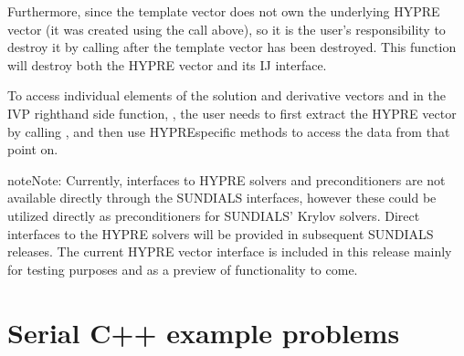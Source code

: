 \documentclass[letterpaper,10pt,english]{sphinxmanual}
\begin{document}
\sphinxAtStartPar
Furthermore, since the template vector does not own the underlying
HYPRE vector (it was created using the  call
above), so it is the user’s responsibility to destroy it by calling
 after the template vector  has
been destroyed.  This function will destroy both the HYPRE vector
and its IJ interface.

\sphinxAtStartPar
To access individual elements of the solution and derivative vectors
 and  in the IVP right\sphinxhyphen{}hand side function, , the
user needs to first extract the HYPRE vector by calling
, and then use HYPRE\sphinxhyphen{}specific methods to access
the data from that point on.

\begin{sphinxadmonition}{note}{Note:}
\sphinxAtStartPar
Currently, interfaces to HYPRE solvers and preconditioners are not
available directly through the SUNDIALS interfaces, however these
could be utilized directly as preconditioners for SUNDIALS’ Krylov
solvers.  Direct interfaces to the HYPRE solvers will be provided
in subsequent SUNDIALS releases.  The current HYPRE vector
interface is included in this release mainly for testing purposes
and as a preview of functionality to come.
\end{sphinxadmonition}

\sphinxstepscope


\chapter{Serial C++ example problems}
\label{\detokenize{cpp_serial:serial-c-example-problems}}\label{\detokenize{cpp_serial:serial-cpp}}\label{\detokenize{cpp_serial::doc}}
\end{document}
